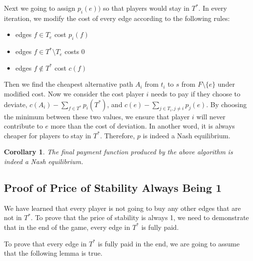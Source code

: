 \documentclass[11pt,psfig,times]{article}
\newtheorem{corollary}{Corollary}[section]
\begin{document}
Next we going to assign \(p_i(e))\) so that players would stay in \(T^*\). In every iteration, we modify the cost of every edge according to the following rules:
\begin{itemize}
	\item edges \(f \in T_e\) cost \(p_i(f)\)
	\item edges \(f \in T^*\setminus T_e\) costs 0
	\item edges \(f\notin T^*\) cost \(c(f)\)
\end{itemize}
Then we find the cheapest alternative path \(A_i\) from \(t_i\) to \(s\) from \(F\setminus \{e\}\) under modified cost. 
Now we consider the cost player \(i\) needs to pay if they choose to deviate, \(c(A_i) - \sum_{f\in T^*}p_i(T^*)\), and \(c(e) - \sum_{j\in T_i,j\neq i}p_j(e)\). By choosing the minimum between these two values, we ensure that player \(i\) will never contribute to \(e\) more than the cost of deviation. In another word, it is always  cheaper for players to stay in \(T^*\). Therefore, \(p\) is indeed a Nash equilibrium. 
\begin{corollary}
	The final payment function produced by the above algorithm is indeed a Nash equilibrium.
\end{corollary}

\subsection{Proof of Price of Stability Always Being 1}
We have learned that every player is not going to buy any other edges that are not in \(T^*\). 
To prove that the price of stability is always 1, we need to demonstrate that in the end of the game, every edge in \(T^*\) is fully paid. 
  

To prove that every edge in \(T^*\) is fully paid in the end, we are going to assume that the following lemma is true. 
\end{document}
